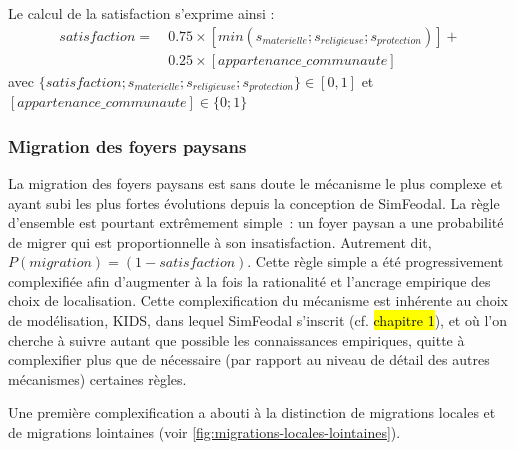 Le calcul de la satisfaction s'exprime ainsi :
\begin{equation*}
\begin{split}
satisfaction =~& 0.75 \times \left[ min \left( s_{materielle} ; s_ {religieuse}; s_{protection} \right) \right] + \\
& 0.25 \times [appartenance\_communaute]
\end{split}
\end{equation*}
avec $ \{satisfaction ; s_{materielle} ; s_ {religieuse} ; s_{protection}\} \in [0,1]$ et $[appartenance\_communaute] \in \{0;1\} $


	\subsubsection{Migration des foyers paysans \label{sssec:migration}}

La migration des foyers paysans est sans doute le mécanisme le plus complexe et ayant subi les plus fortes évolutions depuis la conception de SimFeodal.
La règle d'ensemble est pourtant extrêmement simple : un foyer paysan a une probabilité de migrer qui est proportionnelle à son insatisfaction. 
Autrement dit, $P \left( migration \right) = \left( 1 - satisfaction \right)$.
Cette règle simple a été progressivement complexifiée afin d'augmenter à la fois la rationalité et l'ancrage empirique des choix de localisation.
Cette complexification du mécanisme est inhérente au choix de modélisation, KIDS, dans lequel SimFeodal s'inscrit (cf. \hl{chapitre 1}), et où l'on cherche à suivre autant que possible les connaissances empiriques, quitte à complexifier plus que de nécessaire (par rapport au niveau de détail des autres mécanismes) certaines règles.

Une première complexification a abouti à la distinction de migrations \og locales\fg{} et de migrations \og lointaines\fg{} (voir \cref{fig:migrations-locales-lointaines}).

